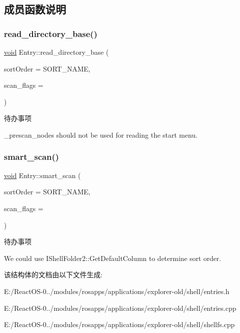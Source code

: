 \subsection{成员函数说明}
\mbox{\label{struct_entry_a60b0ecb89c8f4d79f5401b892b3ac190}} 
\subsubsection{\texorpdfstring{read\+\_\+directory\+\_\+base()}{read\_directory\_base()}}
{\footnotesize\ttfamily \hyperlink{interfacevoid}{void} Entry\+::read\+\_\+directory\+\_\+base (\begin{DoxyParamCaption}\item[{S\+O\+R\+T\+\_\+\+O\+R\+D\+ER}]{sort\+Order = {\ttfamily SORT\+\_\+NAME},  }\item[{int}]{scan\+\_\+flags = {} }\end{DoxyParamCaption})}

\begin{DoxyRefDesc}{待办事项}
\item[\hyperlink{todo__todo000025}{待办事项}]\+\_\+prescan\+\_\+nodes should not be used for reading the start menu. \end{DoxyRefDesc}
\mbox{\label{struct_entry_ac7af5ff20fa83e4962caf8e59e1ee437}} 
\subsubsection{\texorpdfstring{smart\+\_\+scan()}{smart\_scan()}}
{\footnotesize\ttfamily \hyperlink{interfacevoid}{void} Entry\+::smart\+\_\+scan (\begin{DoxyParamCaption}\item[{S\+O\+R\+T\+\_\+\+O\+R\+D\+ER}]{sort\+Order = {\ttfamily SORT\+\_\+NAME},  }\item[{int}]{scan\+\_\+flags = {} }\end{DoxyParamCaption})}

\begin{DoxyRefDesc}{待办事项}
\item[\hyperlink{todo__todo000026}{待办事项}]We could use I\+Shell\+Folder2\+::\+Get\+Default\+Column to determine sort order. \end{DoxyRefDesc}


该结构体的文档由以下文件生成\+:\begin{DoxyCompactItemize}
\item 
E\+:/\+React\+O\+S-\/0../modules/rosapps/applications/explorer-\/old/shell/entries.\+h\item 
E\+:/\+React\+O\+S-\/0../modules/rosapps/applications/explorer-\/old/shell/entries.\+cpp\item 
E\+:/\+React\+O\+S-\/0../modules/rosapps/applications/explorer-\/old/shell/shellfs.\+cpp\end{DoxyCompactItemize}

